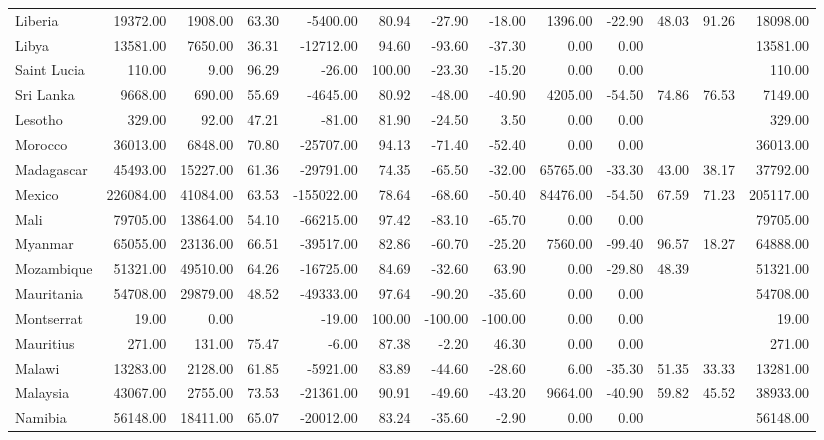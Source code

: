 \begin{table}[ht]
\begin{tabular}{lrrrrrrrrrrrr}
  Liberia & 19372.00 & 1908.00 & 63.30 & -5400.00 & 80.94 & -27.90 & -18.00 & 1396.00 & -22.90 & 48.03 & 91.26 & 18098.00 \\ 
  Libya & 13581.00 & 7650.00 & 36.31 & -12712.00 & 94.60 & -93.60 & -37.30 & 0.00 & 0.00 &  &  & 13581.00 \\ 
  Saint Lucia & 110.00 & 9.00 & 96.29 & -26.00 & 100.00 & -23.30 & -15.20 & 0.00 & 0.00 &  &  & 110.00 \\ 
  Sri Lanka & 9668.00 & 690.00 & 55.69 & -4645.00 & 80.92 & -48.00 & -40.90 & 4205.00 & -54.50 & 74.86 & 76.53 & 7149.00 \\ 
  Lesotho & 329.00 & 92.00 & 47.21 & -81.00 & 81.90 & -24.50 & 3.50 & 0.00 & 0.00 &  &  & 329.00 \\ 
  Morocco & 36013.00 & 6848.00 & 70.80 & -25707.00 & 94.13 & -71.40 & -52.40 & 0.00 & 0.00 &  &  & 36013.00 \\ 
  Madagascar & 45493.00 & 15227.00 & 61.36 & -29791.00 & 74.35 & -65.50 & -32.00 & 65765.00 & -33.30 & 43.00 & 38.17 & 37792.00 \\ 
  Mexico & 226084.00 & 41084.00 & 63.53 & -155022.00 & 78.64 & -68.60 & -50.40 & 84476.00 & -54.50 & 67.59 & 71.23 & 205117.00 \\ 
  Mali & 79705.00 & 13864.00 & 54.10 & -66215.00 & 97.42 & -83.10 & -65.70 & 0.00 & 0.00 &  &  & 79705.00 \\ 
  Myanmar & 65055.00 & 23136.00 & 66.51 & -39517.00 & 82.86 & -60.70 & -25.20 & 7560.00 & -99.40 & 96.57 & 18.27 & 64888.00 \\ 
  Mozambique & 51321.00 & 49510.00 & 64.26 & -16725.00 & 84.69 & -32.60 & 63.90 & 0.00 & -29.80 & 48.39 &  & 51321.00 \\ 
  Mauritania & 54708.00 & 29879.00 & 48.52 & -49333.00 & 97.64 & -90.20 & -35.60 & 0.00 & 0.00 &  &  & 54708.00 \\ 
  Montserrat & 19.00 & 0.00 &  & -19.00 & 100.00 & -100.00 & -100.00 & 0.00 & 0.00 &  &  & 19.00 \\ 
  Mauritius & 271.00 & 131.00 & 75.47 & -6.00 & 87.38 & -2.20 & 46.30 & 0.00 & 0.00 &  &  & 271.00 \\ 
  Malawi & 13283.00 & 2128.00 & 61.85 & -5921.00 & 83.89 & -44.60 & -28.60 & 6.00 & -35.30 & 51.35 & 33.33 & 13281.00 \\ 
  Malaysia & 43067.00 & 2755.00 & 73.53 & -21361.00 & 90.91 & -49.60 & -43.20 & 9664.00 & -40.90 & 59.82 & 45.52 & 38933.00 \\ 
  Namibia & 56148.00 & 18411.00 & 65.07 & -20012.00 & 83.24 & -35.60 & -2.90 & 0.00 & 0.00 &  &  & 56148.00 \\ 

\end{tabular}
\end{table}
